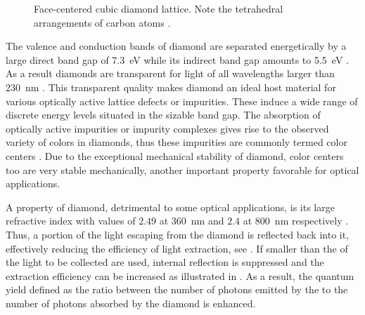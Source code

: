   \begin{figure}[htbp]
		\centering
		\caption[Face-centered cubic diamond lattice]{Face-centered cubic diamond lattice. Note the tetrahedral arrangements of carbon atoms \cite{demtroder2000experimentalphysik}.}
		\label{fig::diamond_lattice}
	\end{figure}

  The valence and conduction bands of diamond are separated energetically by a large direct band gap of \SI{7.3}{\eV} while its indirect band gap amounts to \SI{5.5}{\eV} \cite{Clark1964, Saslow1966}. As a result diamonds are transparent for light of all wavelengths larger than \SI{230}{\nm} \cite{Mildren2008}. This transparent quality makes diamond an ideal host material for various optically active lattice defects or impurities. These induce a wide range of discrete energy levels situated in the sizable band gap. The absorption of optically active impurities or impurity complexes gives rise to the observed variety of colors in diamonds, thus these impurities are commonly termed color centers \cite{Neu2012}. Due to the exceptional mechanical stability of diamond, color centers too are very stable mechanically, another important property favorable for optical applications.

  A property of diamond, detrimental to some optical applications, is its large refractive index with values of $2.49$ at \SI{360}{\nm} and $2.4$ at \SI{800}{\nm} respectively \cite{Zaitsev2001}. Thus, a portion of the light escaping from the diamond is reflected back into it, effectively reducing the efficiency of light extraction, see . If \nds smaller than the \wl of the light to be collected are used, internal reflection is suppressed and the extraction efficiency can be increased \cite{Beveratos2001} as illustrated in . As a result, the quantum yield defined as the ratio between the number of photons emitted by the \siv to the number of photons absorbed by the diamond is enhanced.


